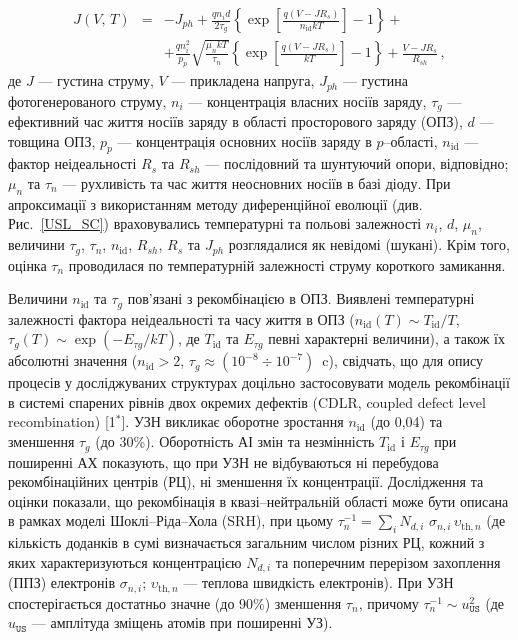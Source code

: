 \begin{eqnarray}
\label{eqSSCIV}
\nonumber J(V,\,T)&=&-J_{ph}+\frac{qn_id}{2\tau_{g}}\left\{\exp \left[\frac{q(V-JR_s)}{n_\mathrm{id}kT}\right]-1\right\}+\\
&&+\frac{qn_i^2}{p_p}\sqrt{\frac{\mu_nkT}{\tau_n}}\left\{\exp \left[\frac{q(V-JR_s)}{kT}\right]-1\right\}+\frac{V-JR_s}{R_{sh}}\,,
\end{eqnarray}
де
$J$ --- густина струму,
$V$ --- прикладена напруга,
$J_{ph}$ --- густина фотогенерованого струму,
$n_i$ --- концентрація власних носіїв заряду,
$\tau_{g}$  --- ефективний час життя носіїв заряду в області просторового заряду (ОПЗ),
$d$ --- товщина ОПЗ,
$p_p$ --- концентрація основних носіїв заряду в $p$--області,
$n_\mathrm{id}$ --- фактор неідеальності
$R_s$ та $R_{sh}$ --- послідовний та шунтуючий опори, відповідно;
$\mu_n$ та $\tau_n$ --- рухливість та час життя неосновних носіїв в базі діоду.
При апроксимації з використанням методу диференційної еволюції (див. Рис.~\ref{USL_SC}) враховувались температурні та польові залежності $n_i$,
$d$, $\mu_n$, величини  $\tau_g$, $\tau_n$, $n_{\mathrm{id}}$, $R_{sh}$, $R_s$ та  $J_{ph}$ розглядалися як невідомі (шукані).
Крім того, оцінка $\tau_n$ проводилася по температурній залежності струму короткого замикання.

Величини $n_\mathrm{id}$ та $\tau_g$ пов'язані з рекомбінацією в ОПЗ.
Виявлені температурні залежності фактора неідеальності та часу життя в ОПЗ
($n_{\mathrm{id}}(T) \sim T_{\mathrm{id}}/T$,
$\tau_{g}(T)\sim\exp\left(-E_{\tau g}/kT\right)$,
де $T_{\mathrm{id}}$ та $E_{\tau g}$ певні характерні величини),
а також їх абсолютні значення ($n_{\mathrm{id}}>2$, $\tau_{g}\approx(10^{-8}\div10^{-7})$~c),
свідчать, що для опису процесів у досліджуваних структурах доцільно застосовувати модель рекомбінації в системі спарених рівнів двох окремих дефектів (CDLR, coupled defect level recombination)
[1$^*$].
УЗН викликає оборотне зростання $n_\mathrm{id}$  (до 0,04) та зменшення $\tau_g$ (до 30\%).
Оборотність АІ змін та незмінність $T_{\mathrm{id}}$ і $E_{\tau g}$ при поширенні АХ показують, що
при УЗН не відбуваються ні перебудова рекомбінаційних центрів (РЦ), ні зменшення їх концентрації.
Дослідження та оцінки показали, що рекомбінація в квазі--нейтральній області може бути описана в рамках моделі Шоклі--Ріда--Хола (SRH), при цьому $\tau_n^{-1}=\sum_i N_{d,i}\,\,\sigma_{n,i}\,\upsilon_{\mathrm{th},n}$
(де
кількість доданків в сумі визначається загальним числом різних РЦ,
кожний з яких характеризуються концентрацією $N_{d,i}$ та поперечним перерізом захоплення (ППЗ) електронів $\sigma_{n,i}$;
$\upsilon_{\mathrm{th},n}$ --- теплова швидкість електронів).
При УЗН спостерігається достатньо значне (до 90\%) зменшення $\tau_n$, причому
$\tau_{n}^{-1}\sim u_\mathtt{US}^2$ (де $u_\mathtt{US}$ --- амплітуда зміщень атомів при поширенні УЗ).

